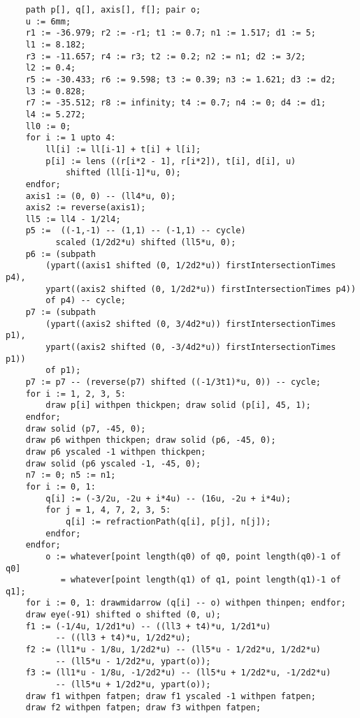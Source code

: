 \documentclass{article}
\begin{document}
\begin{lstlisting}
    path p[], q[], axis[], f[]; pair o;
    u := 6mm;
    r1 := -36.979; r2 := -r1; t1 := 0.7; n1 := 1.517; d1 := 5;
    l1 := 8.182;
    r3 := -11.657; r4 := r3; t2 := 0.2; n2 := n1; d2 := 3/2;
    l2 := 0.4;
    r5 := -30.433; r6 := 9.598; t3 := 0.39; n3 := 1.621; d3 := d2;
    l3 := 0.828;
    r7 := -35.512; r8 := infinity; t4 := 0.7; n4 := 0; d4 := d1;
    l4 := 5.272;
    ll0 := 0;
    for i := 1 upto 4:
    	ll[i] := ll[i-1] + t[i] + l[i];
    	p[i] := lens ((r[i*2 - 1], r[i*2]), t[i], d[i], u) 
	        shifted (ll[i-1]*u, 0);
    endfor;
    axis1 := (0, 0) -- (ll4*u, 0);
    axis2 := reverse(axis1);
    ll5 := ll4 - 1/2l4;
    p5 :=  ((-1,-1) -- (1,1) -- (-1,1) -- cycle)
          scaled (1/2d2*u) shifted (ll5*u, 0);
    p6 := (subpath 
        (ypart((axis1 shifted (0, 1/2d2*u)) firstIntersectionTimes p4), 
        ypart((axis2 shifted (0, 1/2d2*u)) firstIntersectionTimes p4))
        of p4) -- cycle;
    p7 := (subpath 
        (ypart((axis2 shifted (0, 3/4d2*u)) firstIntersectionTimes p1), 
        ypart((axis2 shifted (0, -3/4d2*u)) firstIntersectionTimes p1))
        of p1);
    p7 := p7 -- (reverse(p7) shifted ((-1/3t1)*u, 0)) -- cycle;
    for i := 1, 2, 3, 5: 
        draw p[i] withpen thickpen; draw solid (p[i], 45, 1); 
    endfor;
    draw solid (p7, -45, 0);
    draw p6 withpen thickpen; draw solid (p6, -45, 0);
    draw p6 yscaled -1 withpen thickpen;
    draw solid (p6 yscaled -1, -45, 0);
    n7 := 0; n5 := n1;
    for i := 0, 1:
        q[i] := (-3/2u, -2u + i*4u) -- (16u, -2u + i*4u);
        for j = 1, 4, 7, 2, 3, 5: 
            q[i] := refractionPath(q[i], p[j], n[j]);
        endfor;
    endfor;
        o := whatever[point length(q0) of q0, point length(q0)-1 of q0] 
           = whatever[point length(q1) of q1, point length(q1)-1 of q1];
    for i := 0, 1: drawmidarrow (q[i] -- o) withpen thinpen; endfor;
    draw eye(-91) shifted o shifted (0, u);
    f1 := (-1/4u, 1/2d1*u) -- ((ll3 + t4)*u, 1/2d1*u)
          -- ((ll3 + t4)*u, 1/2d2*u);
    f2 := (ll1*u - 1/8u, 1/2d2*u) -- (ll5*u - 1/2d2*u, 1/2d2*u)
          -- (ll5*u - 1/2d2*u, ypart(o));
    f3 := (ll1*u - 1/8u, -1/2d2*u) -- (ll5*u + 1/2d2*u, -1/2d2*u)
          -- (ll5*u + 1/2d2*u, ypart(o));
    draw f1 withpen fatpen; draw f1 yscaled -1 withpen fatpen;
    draw f2 withpen fatpen; draw f3 withpen fatpen;
\end{lstlisting}
\end{document}

